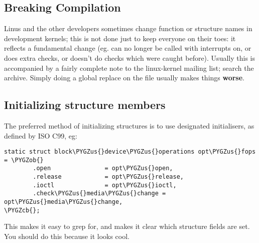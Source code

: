 \documentclass[a4paper,8pt,english]{sphinxmanual}
\def\PYGZus{\char`\_}
\def\PYGZob{\char`\{}
\def\PYGZcb{\char`\}}
\begin{document}
\subsection{Breaking Compilation}
\label{kernel-hacking/hacking:breaking-compilation}
Linus and the other developers sometimes change function or structure
names in development kernels; this is not done just to keep everyone on
their toes: it reflects a fundamental change (eg. can no longer be
called with interrupts on, or does extra checks, or doesn't do checks
which were caught before). Usually this is accompanied by a fairly
complete note to the linux-kernel mailing list; search the archive.
Simply doing a global replace on the file usually makes things \textbf{worse}.


\subsection{Initializing structure members}
\label{kernel-hacking/hacking:initializing-structure-members}
The preferred method of initializing structures is to use designated
initialisers, as defined by ISO C99, eg:

\begin{Verbatim}[commandchars=\\\{\}]
static struct block\PYGZus{}device\PYGZus{}operations opt\PYGZus{}fops = \PYGZob{}
        .open               = opt\PYGZus{}open,
        .release            = opt\PYGZus{}release,
        .ioctl              = opt\PYGZus{}ioctl,
        .check\PYGZus{}media\PYGZus{}change = opt\PYGZus{}media\PYGZus{}change,
\PYGZcb{};
\end{Verbatim}

This makes it easy to grep for, and makes it clear which structure
fields are set. You should do this because it looks cool.
\end{document}
